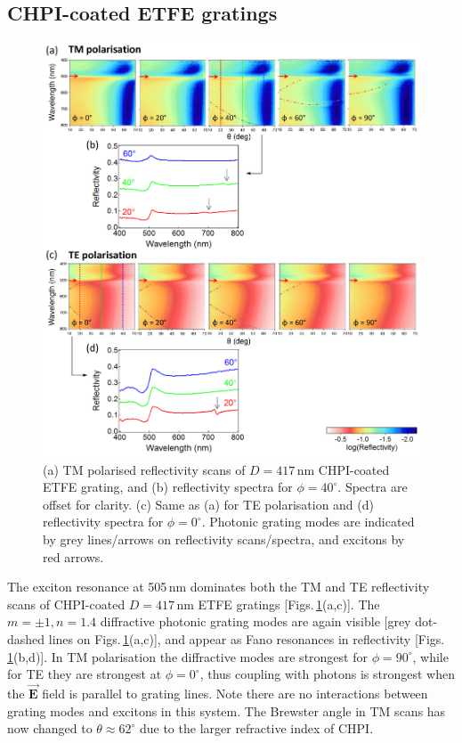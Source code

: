 \subsection{CHPI-coated ETFE gratings}
\begin{figure}[h!] 
\centering    
\includegraphics[width=\textwidth]{Fig3}
\caption[Reflectivity measurements of $D=417$\,nm CHPI-coated ETFE grating in (a,b) TM and (c,d) TE polarisation.]{(a) TM polarised reflectivity scans of $D=417$\,nm CHPI-coated ETFE grating, and (b) reflectivity spectra for $\phi=40^{\circ}$. Spectra are offset for clarity. (c) Same as (a) for TE polarisation and (d) reflectivity spectra for $\phi=0^{\circ}$. Photonic grating modes are indicated by grey lines/arrows on reflectivity scans/spectra, and excitons by red arrows.}
\label{7Fig3}
\end{figure}
The exciton resonance at 505\,nm dominates both the TM and TE reflectivity scans of CHPI-coated $D=417$\,nm ETFE gratings [Figs.\,\ref{7Fig3}(a,c)]. The $m=\pm1, n=1.4$ diffractive photonic grating modes are again visible [grey dot-dashed lines on Figs.\,\ref{7Fig3}(a,c)], and appear as Fano resonances in reflectivity [Figs.\,\ref{7Fig3}(b,d)]. In TM polarisation the diffractive modes are strongest for $\phi=90^{\circ}$, while for TE they are strongest at $\phi=0^{\circ}$, thus coupling with photons is strongest when the $\vec{\mathbf{E}}$ field is parallel to grating lines. Note there are no interactions between grating modes and excitons in this system. The Brewster angle in TM scans has now changed to $\theta\approx62^{\circ}$ due to the larger refractive index of CHPI.


